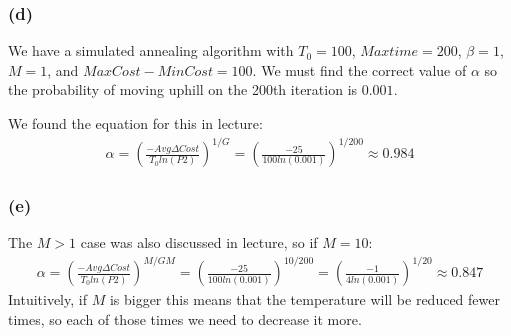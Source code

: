 \documentclass[12pt]{article}
\begin{document}
\subsubsection{(d)}
We have a simulated annealing algorithm with $T_0 = 100$, $Maxtime = 200$, $\beta=1$, $M=1$, and $MaxCost - MinCost = 100$.  We must find the correct value of $\alpha$ so the probability of moving uphill on the 200th iteration is $0.001$.

We found the equation for this in lecture:
\begin{align*}
\alpha  = \left( \frac{-Avg\Delta Cost}{T_0 ln(P2)} \right)^{1/G}
= \left( \frac{-25}{100 ln(0.001)} \right)^{1/200}
\approx 0.984
\end{align*}

\subsubsection{(e)}
The $M>1$ case was also discussed in lecture, so if $M=10$:
\begin{align*}
\alpha  = \left( \frac{-Avg\Delta Cost}{T_0 ln(P2)} \right)^{M/GM}
= \left( \frac{-25}{100 ln(0.001)} \right)^{10/200}
= \left( \frac{-1}{4 ln(0.001)} \right)^{1/20}
\approx 0.847
\end{align*}
Intuitively, if $M$ is bigger this means that the temperature will be reduced fewer times, so each of those times we need to decrease it more.
\end{document}
